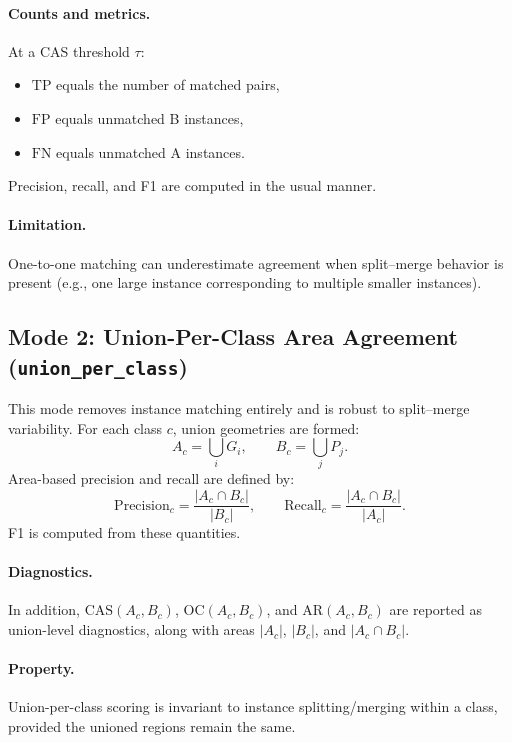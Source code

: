 \documentclass[11pt]{article}
\begin{document}
\paragraph{Counts and metrics.}
At a CAS threshold $\tau$:
\begin{itemize}[leftmargin=*]
  \item $\mathrm{TP}$ equals the number of matched pairs,
  \item $\mathrm{FP}$ equals unmatched B instances,
  \item $\mathrm{FN}$ equals unmatched A instances.
\end{itemize}
Precision, recall, and F1 are computed in the usual manner.

\paragraph{Limitation.}
One-to-one matching can underestimate agreement when split--merge behavior is present (e.g., one large instance corresponding to multiple smaller instances).

\subsection{Mode 2: Union-Per-Class Area Agreement (\texttt{union\_per\_class})}
This mode removes instance matching entirely and is robust to split--merge variability.
For each class $c$, union geometries are formed:
\[
A_c = \bigcup_i G_i,\qquad B_c = \bigcup_j P_j.
\]
Area-based precision and recall are defined by:
\begin{equation}
\mathrm{Precision}_c = \frac{|A_c\cap B_c|}{|B_c|},\qquad
\mathrm{Recall}_c = \frac{|A_c\cap B_c|}{|A_c|}.
\end{equation}
F1 is computed from these quantities.

\paragraph{Diagnostics.}
In addition, $\mathrm{CAS}(A_c,B_c)$, $\mathrm{OC}(A_c,B_c)$, and $\mathrm{AR}(A_c,B_c)$ are reported as union-level diagnostics, along with areas $|A_c|$, $|B_c|$, and $|A_c\cap B_c|$.

\paragraph{Property.}
Union-per-class scoring is invariant to instance splitting/merging within a class, provided the unioned regions remain the same.
\end{document}
